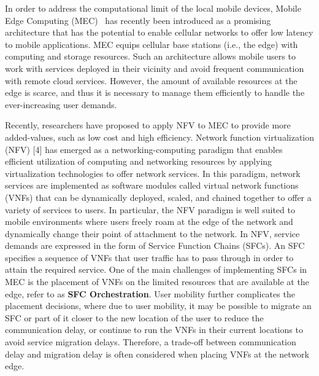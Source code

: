 In order to address the computational limit of the local mobile devices, Mobile Edge Computing (MEC)~\cite{mec_wp} has recently been introduced as a promising architecture that has the potential to enable cellular networks to offer low latency to mobile applications. MEC equips cellular base stations (i.e., the edge) with computing and storage resources. Such an architecture allows mobile users to work with services deployed in their vicinity and avoid frequent communication with remote cloud services. However, the amount of available resources at the edge is scarce, and thus it is necessary to manage them efficiently to handle the ever-increasing user demands.

Recently, researchers \cite{sfcgeo, visualcomputing, yang2019delay, xu2020nfv} have proposed to apply NFV to MEC to provide more added-values, such as low cost and high efficiency. Network function virtualization (NFV) [4] has emerged as a networking-computing paradigm that enables efficient utilization of computing and networking resources by applying virtualization technologies to offer network services. In this paradigm, network services are implemented as software modules called virtual network functions (VNFs) that can be dynamically deployed, scaled, and chained together to offer a variety of services to users. In particular, the NFV paradigm is well suited to mobile environments where users freely roam at the edge of the network and dynamically change their point of attachment to the network. 
In NFV, service demands are expressed in the form of Service Function Chains (SFCs). An SFC specifies a sequence of VNFs that user traffic has to pass through in order to attain the required service. 
One of the main challenges of implementing SFCs in MEC is the placement of VNFs on the limited resources that are available at the edge, refer to as \textbf{SFC Orchestration}. User mobility further complicates the placement decisions, where due to user mobility, it may be possible to migrate an SFC or part of it closer to the new location of the user to reduce the communication delay, or continue to run the VNFs in their current locations to avoid service migration delays. Therefore, a trade-off between communication delay and migration delay is often considered when placing VNFs at the network edge.
%


